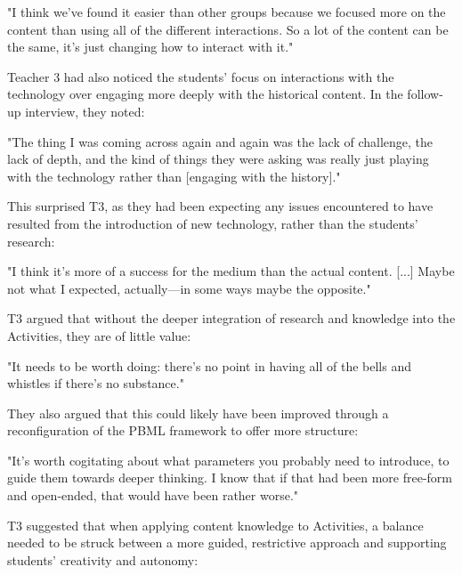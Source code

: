 \begin{displayquote}
"I think we've found it easier than other groups because we focused more on the content than using all of the different interactions. So a lot of the content can be the same, it's just changing how to interact with it."
\end{displayquote}

Teacher 3 had also noticed the students' focus on interactions with the technology over engaging more deeply with the historical content. In the follow-up interview, they noted: 

\begin{displayquote}
"The thing I was coming across again and again was the lack of challenge, the lack of depth, and the kind of things they were asking was really just playing with the technology rather than [engaging with the history]."
\end{displayquote}

This surprised T3, as they had been expecting any issues encountered to have resulted from the introduction of new technology, rather than the students' research: 

\begin{displayquote}
"I think it's more of a success for the medium than the actual content. [...] Maybe not what I expected, actually---in some ways maybe the opposite."
\end{displayquote}

T3 argued that without the deeper integration of research and knowledge into the Activities, they are of little value: 

\begin{displayquote}
"It needs to be worth doing: there's no point in having all of the bells and whistles if there's no substance."
\end{displayquote}

They also argued that this could likely have been improved through a reconfiguration of the PBML framework to offer more structure: 

\begin{displayquote}
"It's worth cogitating about what parameters you probably need to introduce, to guide them towards deeper thinking. I know that if that had been more free-form and open-ended, that would have been rather worse."
\end{displayquote}

T3 suggested that when applying content knowledge to Activities, a balance needed to be struck between a more guided, restrictive approach and supporting students' creativity and autonomy:

